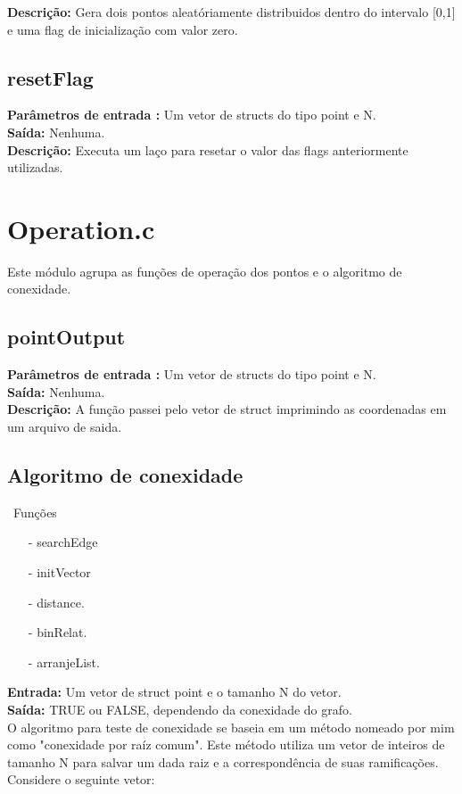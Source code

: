 \documentclass[a4paper,11pt]{article}
\begin{document}
\textbf{Descrição:}
Gera dois pontos aleatóriamente distribuidos dentro do intervalo [0,1] e uma flag de inicialização com valor zero.

\subsection{resetFlag}
\textbf{Parâmetros de entrada :} Um vetor de structs do tipo point e N. \\
\textbf{Saída:} Nenhuma.\\

\textbf{Descrição:}
Executa um laço para resetar o valor das flags anteriormente utilizadas.

\section{Operation.c}
  Este módulo agrupa as funções de operação dos pontos e o algoritmo de conexidade.
  
\subsection{pointOutput}
\textbf{Parâmetros de entrada :} Um vetor de structs do tipo point e N. \\
\textbf{Saída:} Nenhuma.\\

\textbf{Descrição:}
A função passei pelo vetor de struct imprimindo as coordenadas em um arquivo de saida.

\subsection{Algoritmo de conexidade}\
Funções
\begin{enumerate}
\item[-] searchEdge 
\item[-] initVector
\item[-] distance.
\item[-] binRelat.
\item[-] arranjeList.
\end{enumerate}
\textbf{Entrada:} Um vetor de struct point e o tamanho N do vetor. \\
\textbf{Saída:} TRUE ou FALSE, dependendo da conexidade do grafo.\\

O algoritmo para teste de conexidade se baseia em um método nomeado por mim como "conexidade por raíz comum". Este método utiliza um vetor de inteiros de tamanho N para salvar um dada raiz e a correspondência de suas ramificações. \\ 
Considere o seguinte vetor:
\end{document}
